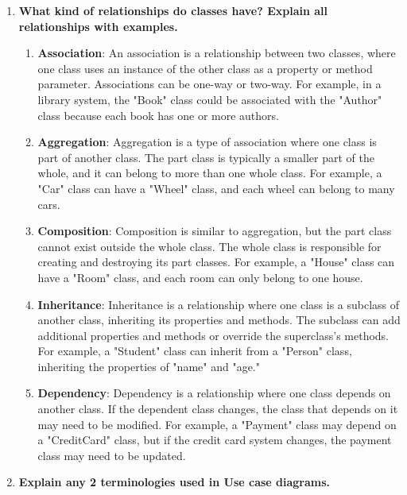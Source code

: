 \documentclass[11pt]{article}
\begin{document}
\begin{enumerate}
	\item \textbf{What kind of relationships do classes have? Explain all relationships with examples.}\\
	      \begin{enumerate}
		      \item \textbf{Association}: An association is a relationship between two classes, where one class uses an instance of the other class as a property or method parameter. Associations can be one-way or two-way. For example, in a library system, the "Book" class could be associated with the "Author" class because each book has one or more authors.

		      \item \textbf{Aggregation}: Aggregation is a type of association where one class is part of another class. The part class is typically a smaller part of the whole, and it can belong to more than one whole class. For example, a "Car" class can have a "Wheel" class, and each wheel can belong to many cars.

		      \item \textbf{Composition}: Composition is similar to aggregation, but the part class cannot exist outside the whole class. The whole class is responsible for creating and destroying its part classes. For example, a "House" class can have a "Room" class, and each room can only belong to one house.

		      \item \textbf{Inheritance}: Inheritance is a relationship where one class is a subclass of another class, inheriting its properties and methods. The subclass can add additional properties and methods or override the superclass's methods. For example, a "Student" class can inherit from a "Person" class, inheriting the properties of "name" and "age."

		      \item \textbf{Dependency}: Dependency is a relationship where one class depends on another class. If the dependent class changes, the class that depends on it may need to be modified. For example, a "Payment" class may depend on a "CreditCard" class, but if the credit card system changes, the payment class may need to be updated.
	      \end{enumerate}

	\item \textbf{Explain any 2 terminologies used in Use case diagrams.}\\


\end{enumerate}
\end{document}
